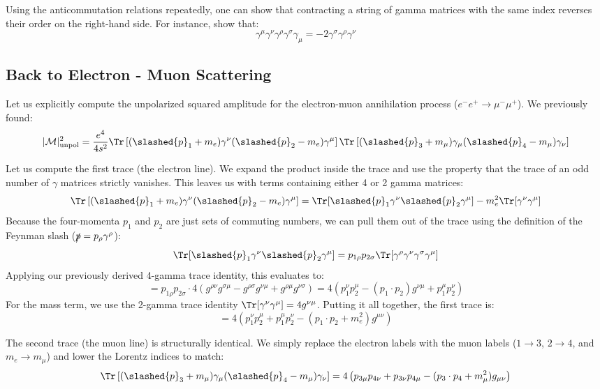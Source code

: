 \begin{example}[Exercise]
    Using the anticommutation relations repeatedly, one can show that contracting a string of gamma matrices with the same index reverses their order on the right-hand side. For instance, show that:
    \[
        \gamma^\mu \gamma^\nu \gamma^\rho \gamma^\sigma \gamma_\mu = -2 \gamma^\sigma \gamma^\rho \gamma^\nu
    \]
\end{example}

\subsection{Back to Electron - Muon Scattering}

Let us explicitly compute the unpolarized squared amplitude for the electron-muon annihilation process ($e^- e^+ \to \mu^- \mu^+$). We previously found:
\[
    \vert \mathcal{M} \vert_{\text{unpol}}^2 = \frac{e^4}{4 s^2} \Tr \left[ (\slashed{p}_1 + m_e) \gamma^\nu (\slashed{p}_2 - m_e) \gamma^\mu \right] \Tr \left[ (\slashed{p}_3 + m_\mu) \gamma_\mu (\slashed{p}_4 - m_\mu) \gamma_\nu \right]
\]

Let us compute the first trace (the electron line). We expand the product inside the trace and use the property that the trace of an odd number of $\gamma$ matrices strictly vanishes. This leaves us with terms containing either 4 or 2 gamma matrices:
\[
    \Tr \left[ (\slashed{p}_1 + m_e) \gamma^\nu (\slashed{p}_2 - m_e) \gamma^\mu \right] = \Tr [\slashed{p}_1 \gamma^\nu \slashed{p}_2 \gamma^\mu] - m_e^2 \Tr [\gamma^\nu \gamma^\mu]
\]
Because the four-momenta $p_1$ and $p_2$ are just sets of commuting numbers, we can pull them out of the trace using the definition of the Feynman slash ($\slashed{p} = p_\rho \gamma^\rho$):
\[
    \Tr [\slashed{p}_1 \gamma^\nu \slashed{p}_2 \gamma^\mu] = p_{1\rho} p_{2\sigma} \Tr [\gamma^\rho \gamma^\nu \gamma^\sigma \gamma^\mu]
\]
Applying our previously derived 4-gamma trace identity, this evaluates to:
\[
    = p_{1\rho} p_{2\sigma} \cdot 4(g^{\rho\nu}g^{\sigma\mu} - g^{\rho\sigma}g^{\nu\mu} + g^{\rho\mu}g^{\nu\sigma}) = 4(p_1^\nu p_2^\mu - (p_1 \cdot p_2)g^{\nu\mu} + p_1^\mu p_2^\nu)
\]
For the mass term, we use the 2-gamma trace identity $\Tr [\gamma^\nu \gamma^\mu] = 4g^{\nu\mu}$. Putting it all together, the first trace is:
\[
    = 4 \left( p_1^\nu p_2^\mu + p_1^\mu p_2^\nu - (p_1 \cdot p_2 + m_e^2) g^{\mu\nu} \right)
\]

The second trace (the muon line) is structurally identical. We simply replace the electron labels with the muon labels ($1 \to 3$, $2 \to 4$, and $m_e \to m_\mu$) and lower the Lorentz indices to match:
\[
    \Tr \left[ (\slashed{p}_3 + m_\mu) \gamma_\mu (\slashed{p}_4 - m_\mu) \gamma_\nu \right] = 4 \left( p_{3\mu} p_{4\nu} + p_{3\nu} p_{4\mu} - (p_3 \cdot p_4 + m_\mu^2) g_{\mu\nu} \right)
\]

